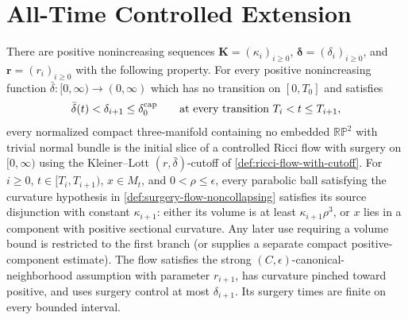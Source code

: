 \section{All-Time Controlled Extension}

\begin{theorem}
\label{thm:all-time-controlled-surgery-flow}
\notready
There are positive nonincreasing sequences
$\mathbf K=(\kappa_i)_{i\ge0}$,
$\boldsymbol\delta=(\delta_i)_{i\ge0}$, and
$\mathbf r=(r_i)_{i\ge0}$ with the following property.  For every positive
nonincreasing function $\bar\delta\colon[0,\infty)\to(0,\infty)$ which has
no transition on $[0,T_0]$ and satisfies
\[
\bar\delta(t)<\delta_{i+1}\le\delta_0^{\rm cap}
\qquad\text{at every transition }T_i<t\le T_{i+1},
\]
every normalized compact three-manifold containing no embedded
$\mathbb{RP}^2$ with trivial normal bundle is the initial slice of a controlled
Ricci flow with surgery on $[0,\infty)$ using the Kleiner--Lott
$(r,\bar\delta)$-cutoff of \ref{def:ricci-flow-with-cutoff}.  For
$i\ge0$, $t\in[T_i,T_{i+1})$, $x\in M_t$, and
$0<\rho\le\epsilon$, every parabolic ball satisfying the curvature hypothesis in
\ref{def:surgery-flow-noncollapsing} satisfies its source disjunction with
constant $\kappa_{i+1}$: either its volume is at least
$\kappa_{i+1}\rho^3$, or $x$ lies in a component with positive sectional
curvature.  Any later use requiring a volume bound is restricted to the first
branch (or supplies a separate compact positive-component estimate).
The flow satisfies the strong $(C,\epsilon)$-canonical-neighborhood assumption
with parameter $r_{i+1}$, has curvature pinched toward positive, and uses
surgery control at most $\delta_{i+1}$.  Its surgery times are finite on every
bounded interval.
\end{theorem}

